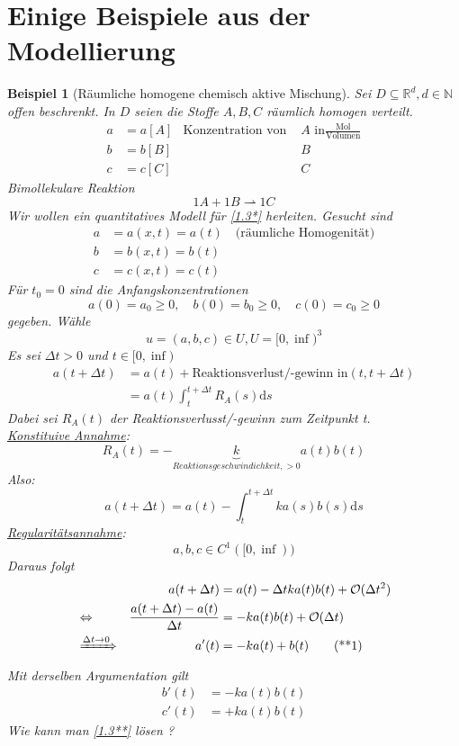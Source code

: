 \documentclass[11pt]{book}
\newcommand{\dd}{\mathrm{d}}
\newcommand{\myTag}[2][]{\tag{#2}\label{#1#2}}
\theoremstyle{break}
\theoremstyle{myStyle}
\newcounter{myCounter}[chapter]
\newtheorem{Bsp}[myCounter]{Beispiel}
\begin{document}
\section{Einige Beispiele aus der Modellierung}

\begin{Bsp}[R\"aumliche homogene chemisch aktive Mischung]
  Sei \( D \subseteq \mathbb{R}^d, d \in \mathbb{N} \) offen beschrenkt. In \( D \) seien die Stoffe \( A,B, C \) r\"aumlich homogen verteilt.
  \begin{align*}
    a &= a[A]  & \text{Konzentration von } &A \text{ in}
    \frac{\text{Mol}}{\text{Volumen}} \\
    b &= b[B]  & &B  \\
    c &= c[C]  & &C 
  \end{align*}
  Bimollekulare Reaktion \[ 1 A + 1 B \rightharpoonup 1C \myTag[1.3]{*} \] Wir
  wollen ein quantitatives Modell f\"ur \eqref{1.3*} herleiten. Gesucht sind 
  \begin{align*}
  a &= a(x,t) = a(t) \quad \text{(r\"aumliche Homogenit\"at)} \\
    b &= b(x,t) = b(t) \\
    c &= c(x,t) = c(t)
  \end{align*}
  F\"ur \( t_0 = 0 \) sind die Anfangskonzentrationen \[ a(0) = a_0 \geq 0, \quad
  b(0) = b_0 \geq 0, \quad c(0) = c_0 \geq 0 \]
  gegeben. W\"ahle \[ u = (a,b,c)  \in U, U = [0,\inf)^3 \]
  Es sei \( \Delta t > 0 \) und \( t \in [0,\inf ) \)
  \begin{align*}
    a (t+\Delta t) &= a(t) + \text{Reaktionsverlust/-gewinn in} (t,t+\Delta t) \\
                   &= a(t) \int_t^{t +\Delta t} R_A(s) \dd s
  \end{align*}
  Dabei sei \( R_A(t) \) der Reaktionsverlusst/-gewinn zum Zeitpunkt t. \\
  \underline{Konstituive Annahme}:
  \[ R_A(t) = - \underbrace{k}_{Reaktionsgeschwindichkeit, > 0}  a(t) b(t) \]
  Also: \[ a(t + \Delta t) = a(t) - \int_t^{t + \Delta t} k a(s) b(s) \dd s \]
  \uline{Regularit\"atsannahme}: \[ a,b,c \in C^1 ([0,\inf)) \]
  Daraus folgt
  \begin{align*}
    & & a(t + \Delta t) &= a(t) - \Delta t k a(t) b(t) + \mathcal{O} (\Delta t^2) \\
    &\Leftrightarrow & \frac{a(t+\Delta t) - a(t)}{\Delta t} &= - k a(t) b(t) +
    \mathcal{O}(\Delta t) \\
    &\xRightarrow{\Delta t \rightarrow 0} & a'(t) &= - k a(t) + b(t)
    \myTag[1.3]{**1}
  \end{align*}
  Mit derselben Argumentation gilt
  \[ \begin{aligned}
    b'(t) &= - k a(t) b(t) \\
    c'(t) &= + k a(t) b(t)
  \end{aligned} \myTag[1.3]{**} \]
  Wie kann man \eqref{1.3**} l\"osen ?


\end{Bsp}
\end{document}
